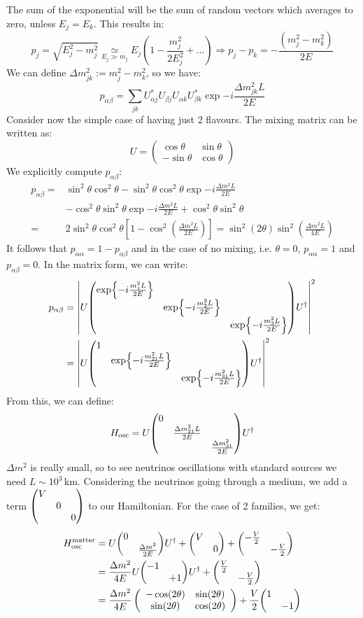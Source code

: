 \documentclass[10.75pt,a4paper,openright,bottom=2cm]{article}
\begin{document}
The sum of the exponential will be the sum of random vectors which averages to zero, unless $E_j=E_k$. This results in:
\[
p_j=\sqrt{E_j^2-m_j^2}\underset{E_j\gg m_j}{\simeq}E_j\left(1-\frac{m_j^2}{2E_j^2}+\dots\right)\Rightarrow p_j-p_k=-\frac{(m_j^2-m_k^2)}{2E}
\]
We can define $\Delta m_{jk}^2:=m_j^2-m_k^2$, so we have:
\[
p_{\alpha\beta}=\sum_{jk}U_{\alpha j}^*U_{\beta j}U_{\alpha k}U_{\beta k}^*\exp{-i\frac{\Delta m_{jk}^2L}{2E}}
\]
Consider now the simple case of having just 2 flavours. The mixing matrix can be written as:
\[
U=\left(\begin{array}{cc}
    \cos\theta & \sin\theta \\
    -\sin\theta & \cos\theta
\end{array}\right)
\]
We explicitly compute $p_{\alpha\beta}$:
\begin{align*}
p_{\alpha\beta}=&\sin^2\theta\cos^2\theta-\sin^2\theta\cos^2\theta\exp{-i\frac{\Delta m^2L}{2E}}\\
&-\cos^2\theta\sin^2\theta\exp{-i\frac{\Delta m^2L}{2E}}+\cos^2\theta\sin^2\theta\\
=&2\sin^2\theta\cos^2\theta\left[1-\cos^2\left(\frac{\Delta m^2L}{2E}\right)\right]=\sin^2(2\theta)\sin^2\left(\frac{\Delta m^2L}{4E}\right)
\end{align*}
It follows that $p_{\alpha\alpha}=1-p_{\alpha\beta}$ and in the case of no mixing, i.e. $\theta=0$, $p_{\alpha\alpha}=1$ and $p_{\alpha\beta}=0$. In the matrix form, we can write:
\begin{align*}
p_{\alpha\beta}&=\left|U\mqty(\dmat{\exp{-i\frac{m_1^2L}{2E}},\exp{-i\frac{m_2^2L}{2E}},\exp{-i\frac{m_3^2L}{2E}}})U^\dagger\right|^2\\
&=\left|U\mqty(\dmat{1,\exp{-i\frac{m_{21}^2L}{2E}},\exp{-i\frac{m_{31}^2L}{2E}}})U^\dagger\right|^2
\end{align*}
From this, we can define:
\[
H_{\text{osc}}=U\mqty(\dmat{0,\frac{\Delta m^2_{21}L}{2E},\frac{\Delta m^2_{31}}{2E}})U^\dagger
\]
$\Delta m^2$ is really small, so to see neutrinos oscillations with standard sources we need $L\sim10^3$\,km. Considering the neutrinos going through a medium, we add a term $\mqty(\dmat{V,0,0})$ to our Hamiltonian. For the case of 2 families, we get:
\begin{align*}
H_{\text{osc}}^{\text{matter}}&=U\mqty(\dmat{0,\frac{\Delta m^2}{2E}})U^\dagger+\mqty(\dmat{V,0})+\mqty(\dmat{-\frac{V}{2},-\frac{V}{2}})\\
&=\frac{\Delta m^2}{4E}U\mqty(\dmat{-1,+1})U^\dagger+\mqty(\dmat{\frac{V}{2},-\frac{V}{2}})\\
&=\frac{\Delta m^2}{4E}\left(\begin{array}{cc}
    -\cos(2\theta) & \sin(2\theta) \\
    \sin(2\theta) & \cos(2\theta)
\end{array}\right)+\frac{V}{2}\mqty(\dmat{1,-1})
\end{align*}
\end{document}
